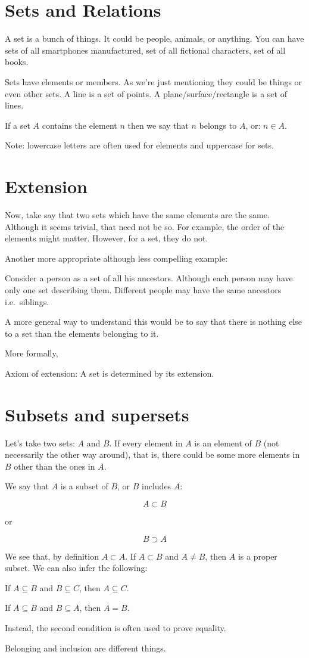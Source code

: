 \documentclass{article}
\author{Ramakrishna Kompella}
\begin{document}
\section*{Sets and Relations}

A set is a bunch of things. It could be people, animals, or anything.  
You can have sets of all smartphones manufactured, set of all fictional characters, set of all books.

Sets have elements or members. As we're just mentioning they could be things or even other sets.  
A line is a set of points.  
A plane/surface/rectangle is a set of lines.

If a set $A$ contains the element $n$ then we say that $n$ belongs to $A$, or: $n \in A$.

Note: lowercase letters are often used for elements and uppercase for sets.

\section*{Extension}

Now, take say that two sets which have the same elements are the same.  
Although it seems trivial, that need not be so.  
For example, the order of the elements might matter. However, for a set, they do not.

Another more appropriate although less compelling example:

Consider a person as a set of all his ancestors.  
Although each person may have only one set describing them.  
Different people may have the same ancestors i.e.\ siblings.

A more general way to understand this would be to say that there is nothing else to a set than the elements belonging to it.

More formally,

Axiom of extension: A set is determined by its extension.

\section*{Subsets and supersets}

Let's take two sets: $A$ and $B$.  
If every element in $A$ is an element of $B$ (not necessarily the other way around),  
that is, there could be some more elements in $B$ other than the ones in $A$.

We say that $A$ is a subset of $B$, or $B$ includes $A$:

\[
A \subset B
\]

or

\[
B \supset A
\]

We see that, by definition $A \subset A$.  
If $A \subset B$ and $A \neq B$, then $A$ is a proper subset.  
We can also infer the following:

If $A \subseteq B$ and $B \subseteq C$, then $A \subseteq C$.

If $A \subseteq B$ and $B \subseteq A$, then $A = B$.

Instead, the second condition is often used to prove equality.

Belonging and inclusion are different things.
\end{document}

